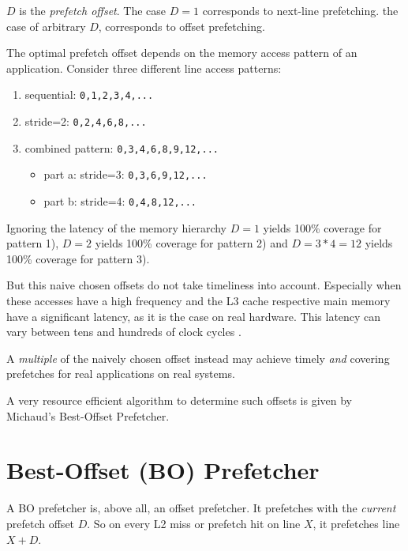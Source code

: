 \documentclass[conference]{IEEEtran}
\begin{document}
$D$ is the \textit{prefetch offset}.
The case $D = 1$ corresponds to next-line prefetching.
the case of arbitrary $D$, corresponds to offset prefetching.

The optimal prefetch offset depends on the memory access pattern of an application.
Consider three different line access patterns:

\begin{enumerate}
    \item sequential: \texttt{0,1,2,3,4,...}
    \item stride=2: \texttt{0,2,4,6,8,...}
    \item{combined pattern: \texttt{0,3,4,6,8,9,12,...}
    \begin{itemize}
        \item part a: stride=3: \texttt{0,3,6,9,12,...}
        \item part b: stride=4: \texttt{0,4,8,12,...}
    \end{itemize}
    }
\end{enumerate}

Ignoring the latency of the memory hierarchy
$D = 1$ yields 100\% coverage for pattern 1),
$D = 2$ yields 100\% coverage for pattern 2) and
$D = 3*4 = 12$ yields 100\% coverage for pattern 3).

But this naive chosen offsets do not take timeliness into account.
Especially when these accesses have a high frequency and
the L3 cache respective main memory have a significant latency, as it is the case on real hardware.
This latency can vary between tens and hundreds of clock cycles \cite[p.~20]{Textbook}.

A \textit{multiple} of the naively chosen offset
instead may achieve timely \textit{and} covering prefetches for real applications on real systems.

A very resource efficient algorithm to determine such offsets is given by Michaud's Best-Offset Prefetcher\cite{BOP_2016}.

\section{Best-Offset (BO) Prefetcher}


A BO prefetcher is, above all, an offset prefetcher.
It prefetches with the \textit{current} prefetch offset $D$.
So on every L2 miss or prefetch hit on line $X$, it prefetches line $X+D$.
\end{document}
